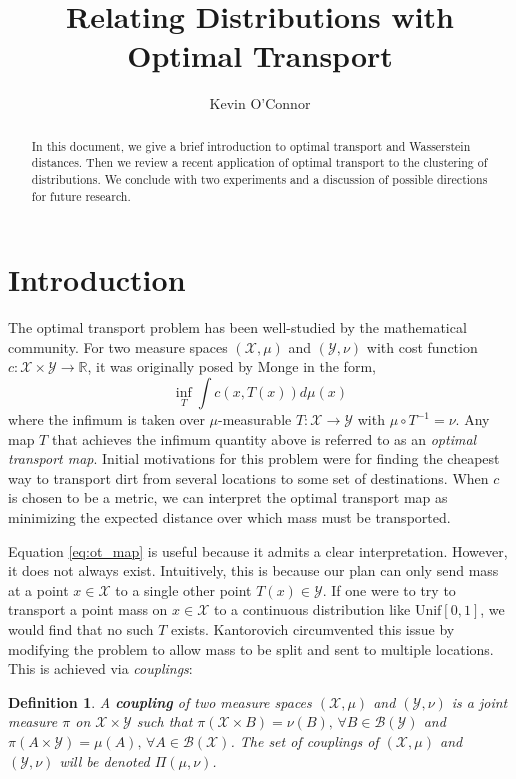 \documentclass[11pt, a4paper, fleqn]{article}
\title{Relating Distributions with Optimal Transport}
\author{Kevin O'Connor}
\date{}
\let\normalint\int %
\def\int{\displaystyle\normalint} %
\numberwithin{equation}{section}
\numberwithin{figure}{section}
\numberwithin{table}{section}
\newtheorem{defn}[thm]{Definition}
\begin{document}
\maketitle

\begin{abstract}
In this document, we give a brief introduction to optimal transport and Wasserstein distances. Then we review a recent application of optimal transport to the clustering of distributions. We conclude with two experiments and a discussion of possible directions for future research.
\end{abstract}

\section{Introduction}
The optimal transport problem has been well-studied by the mathematical community. For two measure spaces $(\mathcal{X}, \mu)$ and $(\mathcal{Y}, \nu)$ with cost function $c: \mathcal{X} \times \mathcal{Y} \rightarrow \mathbb{R}$, it was originally posed by Monge in the form,
\begin{equation}\label{eq:ot_map}
\inf_T \int c(x, T(x)) d\mu(x)
\end{equation}
where the infimum is taken over $\mu$-measurable $T: \mathcal{X} \rightarrow \mathcal{Y}$ with $\mu \circ T^{-1} = \nu$. Any map $T$ that achieves the infimum quantity above is referred to as an \textit{optimal transport map}. Initial motivations for this problem were for finding the cheapest way to transport dirt from several locations to some set of destinations. When $c$ is chosen to be a metric, we can interpret the optimal transport map as minimizing the expected distance over which mass must be transported.

Equation \eqref{eq:ot_map} is useful because it admits a clear interpretation. However, it does not always exist. Intuitively, this is because our plan can only send mass at a point $x \in \mathcal{X}$ to a single other point $T(x) \in \mathcal{Y}$. If one were to try to transport a point mass on $x \in \mathcal{X}$ to a continuous distribution like $\mbox{Unif}[0,1]$, we would find that no such $T$ exists. Kantorovich circumvented this issue by modifying the problem to allow mass to be split and sent to multiple locations. This is achieved via \textit{couplings}:

\begin{defn}
A \textbf{coupling} of two measure spaces $(\mathcal{X}, \mu)$ and $(\mathcal{Y}, \nu)$ is a joint measure $\pi$ on $\mathcal{X} \times \mathcal{Y}$ such that $\pi(\mathcal{X} \times B) = \nu(B), \, \forall B \in \mathcal{B}(\mathcal{Y})$ and $\pi(A \times \mathcal{Y}) = \mu(A), \,\forall A \in \mathcal{B}(\mathcal{X})$. The set of couplings of $(\mathcal{X}, \mu)$ and $(\mathcal{Y}, \nu)$ will be denoted $\Pi(\mu, \nu)$.
\end{defn}
\end{document}
